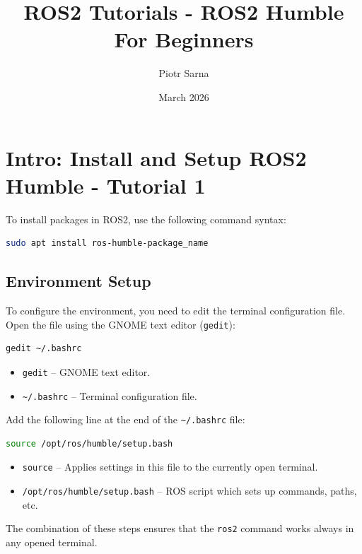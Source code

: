 \documentclass{article}
\title{ROS2 Tutorials - ROS2 Humble For Beginners}
\author{Piotr Sarna}
\date{March 2026}
\newcommand{\code}[1]{\colorbox{codeBg}{\texttt{#1}}}
\begin{document}
\maketitle
\tableofcontents
\newpage

\section{Intro: Install and Setup ROS2 Humble - Tutorial 1}

To install packages in ROS2, use the following command syntax:
\begin{lstlisting}[style=bashStyle, language=bash]
sudo apt install ros-humble-package_name
\end{lstlisting}

\subsection*{Environment Setup}

To configure the environment, you need to edit the terminal configuration file. Open the file using the GNOME text editor (\code{gedit}):
\begin{lstlisting}[style=bashStyle, language=bash]
gedit ~/.bashrc
\end{lstlisting}
\begin{itemize}
    \item \code{gedit} -- GNOME text editor.
    \item \code{\textasciitilde/.bashrc} -- Terminal configuration file.
\end{itemize}

\vspace{0.3cm}
\noindent Add the following line at the end of the \code{\textasciitilde/.bashrc} file:
\begin{lstlisting}[style=bashStyle, language=bash]
source /opt/ros/humble/setup.bash
\end{lstlisting}

\begin{itemize}
    \item \code{source} -- Applies settings in this file to the currently open terminal.
    \item \code{/opt/ros/humble/setup.bash} -- ROS script which sets up commands, paths, etc.
\end{itemize}

\vspace{0.3cm}
\begin{notebox}[Summary]
The combination of these steps ensures that the \code{ros2} command works always in any opened terminal.
\end{notebox}
\end{document}
